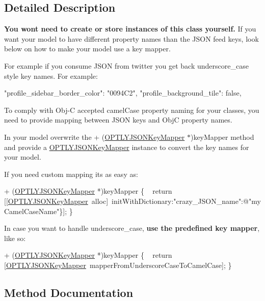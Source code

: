 \subsection{Detailed Description}
{\bfseries You won\textquotesingle{}t need to create or store instances of this class yourself.} If you want your model to have different property names than the J\+S\+ON feed keys, look below on how to make your model use a key mapper.

For example if you consume J\+S\+ON from twitter you get back underscore\+\_\+case style key names. For example\+:


\begin{DoxyPre}"profile\_sidebar\_border\_color": "0094C2",
"profile\_background\_tile": false,\end{DoxyPre}


To comply with Obj-\/C accepted camel\+Case property naming for your classes, you need to provide mapping between J\+S\+ON keys and ObjC property names.

In your model overwrite the + (\mbox{\hyperlink{interface_o_p_t_l_y_j_s_o_n_key_mapper}{O\+P\+T\+L\+Y\+J\+S\+O\+N\+Key\+Mapper}} $\ast$)key\+Mapper method and provide a \mbox{\hyperlink{interface_o_p_t_l_y_j_s_o_n_key_mapper}{O\+P\+T\+L\+Y\+J\+S\+O\+N\+Key\+Mapper}} instance to convert the key names for your model.

If you need custom mapping it\textquotesingle{}s as easy as\+: 
\begin{DoxyPre}
+ (\mbox{\hyperlink{interface_o_p_t_l_y_j_s_o_n_key_mapper}{OPTLYJSONKeyMapper}} *)keyMapper \{
~ return [[\mbox{\hyperlink{interface_o_p_t_l_y_j_s_o_n_key_mapper}{OPTLYJSONKeyMapper}}~alloc]~initWithDictionary:"crazy\_JSON\_name":@"myCamelCaseName"\}];
\}
\end{DoxyPre}
 In case you want to handle underscore\+\_\+case, {\bfseries use the predefined key mapper}, like so\+: 
\begin{DoxyPre}
+ (\mbox{\hyperlink{interface_o_p_t_l_y_j_s_o_n_key_mapper}{OPTLYJSONKeyMapper}} *)keyMapper \{
~ return [\mbox{\hyperlink{interface_o_p_t_l_y_j_s_o_n_key_mapper}{OPTLYJSONKeyMapper}}~mapperFromUnderscoreCaseToCamelCase];
\}
\end{DoxyPre}
 

\subsection{Method Documentation}
\mbox{\label{interface_o_p_t_l_y_j_s_o_n_key_mapper_ae7748aaf30931ec4f8f36dd18845345f}} 
